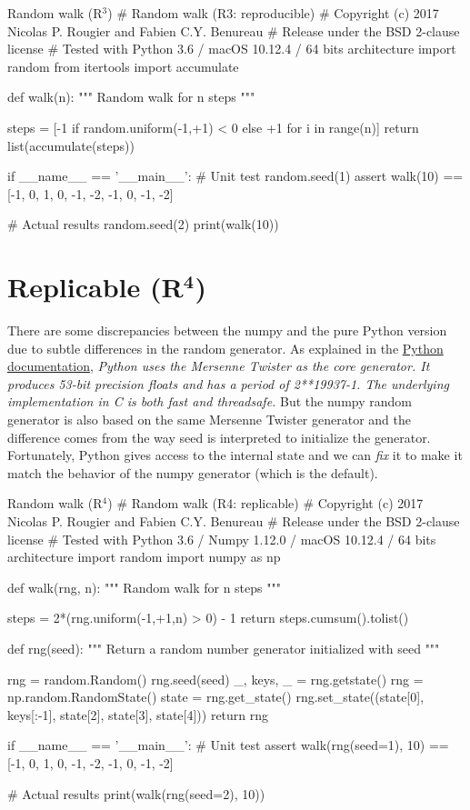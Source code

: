 \documentclass[a4paper,11pt]{article}
\begin{document}

\begin{code}{Random walk (R$^3$)}
# Random walk (R3: reproducible)
# Copyright (c) 2017 Nicolas P. Rougier and Fabien C.Y. Benureau
# Release under the BSD 2-clause license
# Tested with Python 3.6 / macOS 10.12.4 / 64 bits architecture
import random
from itertools import accumulate

def walk(n):
    """ Random walk for n steps """

    steps = [-1 if random.uniform(-1,+1) < 0 else +1 for i in range(n)]
    return list(accumulate(steps))

if __name__ == '__main__':
    # Unit test
    random.seed(1)
    assert walk(10) == [-1, 0, 1, 0, -1, -2, -1, 0, -1, -2]

    # Actual results
    random.seed(2)
    print(walk(10))
\end{code}


\clearpage
\section*{Replicable (R$^{\mathbf 4}$)}

There are some discrepancies between the numpy and the pure Python version due to subtle differences in the random generator.
As explained in the \href{https://docs.python.org/3.6/library/random.html}{Python documentation}, {\em Python uses the Mersenne Twister as the core generator. It produces 53-bit precision floats
and has a period of 2**19937-1.
The underlying implementation in C is both fast and threadsafe.}
But the numpy random generator is also based on the same Mersenne Twister generator and the difference comes from the way seed is interpreted to initialize the generator.
Fortunately, Python gives access to the internal state and we can {\em fix} it to make it match the behavior of the numpy generator (which is the default).

\begin{code}{Random walk (R$^4$)}
# Random walk (R4: replicable)
# Copyright (c) 2017 Nicolas P. Rougier and Fabien C.Y. Benureau
# Release under the BSD 2-clause license
# Tested with Python 3.6 / Numpy 1.12.0 / macOS 10.12.4 / 64 bits architecture
import random
import numpy as np

def walk(rng, n):
    """ Random walk for n steps """

    steps = 2*(rng.uniform(-1,+1,n) > 0) - 1
    return steps.cumsum().tolist()

def rng(seed):
    """ Return a random number generator initialized with seed """ 
    
    rng = random.Random()
    rng.seed(seed)
    _, keys, _ = rng.getstate()
    rng = np.random.RandomState()
    state = rng.get_state()
    rng.set_state((state[0], keys[:-1], state[2], state[3], state[4]))
    return rng

if __name__ == '__main__':
    # Unit test
    assert walk(rng(seed=1), 10) == [-1, 0, 1, 0, -1, -2, -1, 0, -1, -2]

    # Actual results
    print(walk(rng(seed=2), 10))
\end{code}
\end{document}
